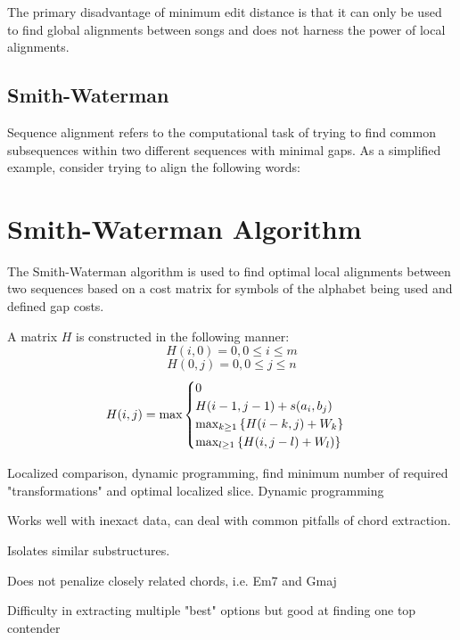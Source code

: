 The primary disadvantage of minimum edit distance is that it can only be used to find global alignments between songs and does not harness the power of local alignments.

\subsection{Smith-Waterman}

Sequence alignment refers to the computational task of trying to find common subsequences within two different sequences with minimal gaps. As a simplified example, consider trying to align the following words:


\section{Smith-Waterman Algorithm}

The Smith-Waterman algorithm is used to find optimal local alignments between two sequences based on a cost matrix for symbols of the alphabet being used and defined gap costs.

A matrix $H$ is constructed in the following manner:
\[ H(i,0) = 0, 0 \leq i \leq m \]
\[ H(0,j) = 0, 0 \leq j \leq n \]
\[ H(i,j) = \hbox{max} \begin{cases} 0 \\ H(i-1,j-1)+s(a_i,b_j) \\ \hbox{max}_{k \geq 1} \left\{ H(i-k,j)+W_k \right\} \\ \hbox{max}_{l \geq 1}\left\{ H(i, j-l)+W_l) \right\} \end{cases}  \]

\item Localized comparison, dynamic programming, find minimum number of required "transformations" and optimal localized slice. Dynamic programming

\item Works well with inexact data, can deal with common pitfalls of chord extraction.

\item Isolates similar substructures.

\item Does not penalize closely related chords, i.e. Em7 and Gmaj

\item Difficulty in extracting multiple "best" options but good at finding one top contender

